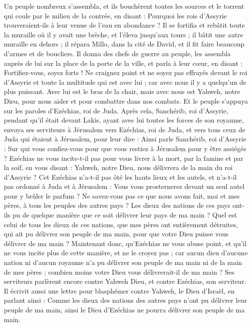 \begin{multicols}{2}
Un peuple nombreux s'assembla, et ils bouchèrent toutes les sources et le torrent qui coule par le milieu de la contrée, en disant : Pourquoi les rois d'Assyrie trouveraient-ils à leur venue de l'eau en abondance ?
Il se fortifia et rebâtit toute la muraille où il y avait une brèche, et l'éleva jusqu'aux tours ; il bâtit une autre muraille en dehors ; il répara Millo, dans la cité de David, et il fit faire beaucoup d'armes et de boucliers.
Il donna des chefs de guerre au peuple, les assembla auprès de lui sur la place de la porte de la ville, et parla à leur cœur, en disant :
Fortifiez-vous, soyez forts ! Ne craignez point et ne soyez pas effrayés devant le roi d'Assyrie et toute la multitude qui est avec lui ; car avec nous il y a quelqu'un de plus puissant.
Avec lui est le bras de la chair, mais avec nous est Yahweh, notre Dieu, pour nous aider et pour combattre dans nos combats. Et le peuple s'appuya sur les paroles d'Ezéchias, roi de Juda.
Après cela, Sanchérib, roi d'Assyrie, pendant qu'il était devant Lakis, ayant avec lui toutes les forces de son royaume, envoya ses serviteurs à Jérusalem vers Ezéchias, roi de Juda, et vers tous ceux de Juda qui étaient à Jérusalem, pour leur dire :
Ainsi parle Sanchérib, roi d'Assyrie : Sur qui vous confiez-vous pour que vous restiez à Jérusalem pour y être assiégés ?
Ezéchias ne vous incite-t-il pas pour vous livrer à la mort, par la famine et par la soif, en vous disant : Yahweh, notre Dieu, nous délivrera de la main du roi d'Assyrie ?
Cet Ezéchias n'a-t-il pas ôté les hauts lieux et les autels, et n'a-t-il pas ordonné à Juda et à Jérusalem : Vous vous prosternerez devant un seul autel pour y brûler le parfum ?
Ne savez-vous pas ce que nous avons fait, moi et mes pères, à tous les peuples des autres pays ? Les dieux des nations de ces pays ont-ils pu de quelque manière que ce soit délivrer leur pays de ma main ?
Quel est celui de tous les dieux de ces nations, que mes pères ont entièrement détruites, qui ait pu délivrer son peuple de ma main, pour que votre Dieu puisse vous délivrer de ma main ?
Maintenant donc, qu'Ezéchias ne vous abuse point, et qu'il ne vous incite plus de cette manière, et ne le croyez pas ; car aucun dieu d'aucune nation ni d'aucun royaume n'a pu délivrer son peuple de ma main ni de la main de mes pères ; combien moins votre Dieu vous délivrerait-il de ma main ?
Ses serviteurs parlèrent encore contre Yahweh Dieu, et contre Ezéchias, son serviteur.
Il écrivit aussi une lettre pour blasphémer contre Yahweh, le Dieu d'Israël, en parlant ainsi : Comme les dieux des nations des autres pays n'ont pu délivrer leur peuple de ma main, ainsi le Dieu d'Ezéchias ne pourra délivrer son peuple de ma main.

\end{multicols}
